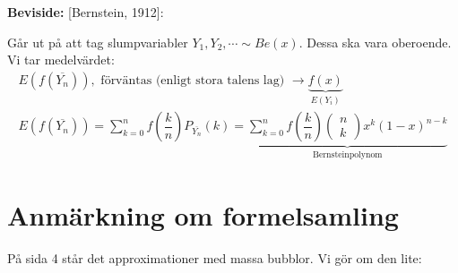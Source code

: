 \par\bigskip
\noindent\textbf{Beviside:} [Bernstein, 1912]:\par
\noindent Går ut på att tag slumpvariabler $Y_1,Y_2,\cdots\sim Be(x)$. Dessa ska vara oberoende. Vi tar medelvärdet:
\begin{equation*}
  \begin{gathered}
    E(f(\overline{Y_n})),\text{ förväntas (enligt stora talens lag) }\to \underbrace{f(x)}_{\text{$E(Y_i)$}}\\
    E(f(\overline{Y_n})) = \sum_{k=0}^{n}f\left(\dfrac{k}{n}\right)P_{\overline{Y_n}}(k) = \underbrace{\sum_{k=0}^{n}f\left(\dfrac{k}{n}\right)\begin{pmatrix}n\\k\end{pmatrix}x^k(1-x)^{n-k}}_{\text{Bernsteinpolynom}}
  \end{gathered}
\end{equation*}
\par\bigskip
\section{Anmärkning om formelsamling}
\par\bigskip
\noindent På sida 4 står det approximationer med massa bubblor. Vi gör om den lite:
